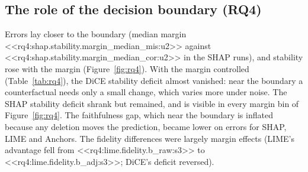 \documentclass[12pt,letterpaper]{article}
\begin{document}
\subsection{The role of the decision boundary (RQ4)}

Errors lay closer to the boundary (median margin
<<rq4:shap.stability.margin_median_mis:u2>> against
<<rq4:shap.stability.margin_median_cor:u2>> in the SHAP runs), and stability rose with
the margin (Figure~\ref{fig:rq4}). With the margin controlled (Table~\ref{tab:rq4}), the
DiCE stability deficit almost vanished: near the boundary a counterfactual needs only a
small change, which varies more under noise. The SHAP stability deficit shrank but
remained, and is visible in every margin bin of Figure~\ref{fig:rq4}. The faithfulness gap,
which near the boundary is inflated because any deletion moves the prediction, became
lower on errors for SHAP, LIME and Anchors. The fidelity differences were largely margin
effects (LIME's advantage fell from <<rq4:lime.fidelity.b_raw:s3>> to
<<rq4:lime.fidelity.b_adj:s3>>; DiCE's deficit reversed).
\end{document}
